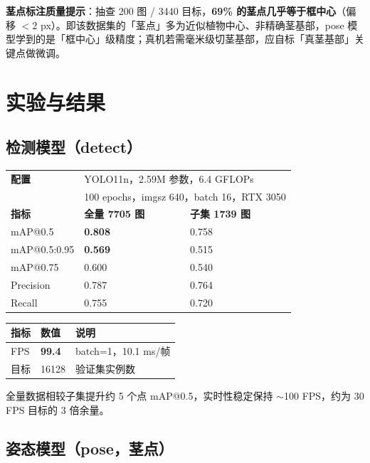 \documentclass[11pt,a4paper]{article}
\begin{document}
\textbf{茎点标注质量提示}：抽查 200 图 / 3440 目标，\textbf{69\% 的茎点几乎等于框中心}（偏移 $<2$ px）。即该数据集的「茎点」多为近似植物中心、非精确茎基部，pose 模型学到的是「框中心」级精度；真机若需毫米级切茎基部，应自标「真茎基部」关键点做微调。

\section{实验与结果}

\subsection{检测模型（detect）}

\begin{table}[h]
\centering
\begin{tabular}{lll}
\toprule
\textbf{配置} & \multicolumn{2}{l}{YOLO11n，2.59M 参数，6.4 GFLOPs} \\
 & \multicolumn{2}{l}{100 epochs，imgsz 640，batch 16，RTX 3050} \\
\midrule
\textbf{指标} & \textbf{全量 7705 图} & \textbf{子集 1739 图} \\
\midrule
mAP@0.5 & \textbf{0.808} & 0.758 \\
mAP@0.5:0.95 & \textbf{0.569} & 0.515 \\
mAP@0.75 & 0.600 & 0.540 \\
Precision & 0.787 & 0.764 \\
Recall & 0.755 & 0.720 \\
\bottomrule
\end{tabular}
\end{table}

\begin{table}[h]
\centering
\begin{tabular}{lll}
\toprule
\textbf{指标} & \textbf{数值} & \textbf{说明} \\
\midrule
FPS & \textbf{99.4} & batch=1，10.1 ms/帧 \\
目标 & 16128 & 验证集实例数 \\
\bottomrule
\end{tabular}
\end{table}

全量数据相较子集提升约 5 个点 mAP@0.5，实时性稳定保持 $\sim$100 FPS，约为 30 FPS 目标的 3 倍余量。

\subsection{姿态模型（pose，茎点）}
\end{document}
